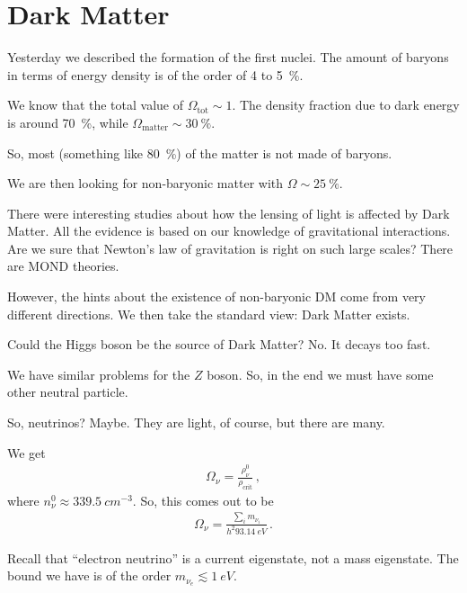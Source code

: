 \documentclass[main.tex]{subfiles}
\begin{document}
\section{Dark Matter}


Yesterday we described the formation of the first nuclei. 
The amount of baryons in terms of energy density is of the order of 4 to \SI{5}{\percent}. 

We know that the total value of \(\Omega _{\text{tot}}  \sim 1\). 
The density fraction due to dark energy is around \SI{70}{\percent}, while \(\Omega _{\text{matter}} \sim \SI{30}{\percent}\).

So, most (something like \SI{80}{\percent}) of the matter is not made of baryons. 

We are then looking for non-baryonic matter with \(\Omega \sim \SI{25}{\percent}\).

There were interesting studies about how the lensing of light is affected by Dark Matter. 
All the evidence is based on our knowledge of gravitational interactions. 
Are we sure that Newton's law of gravitation is right on such large scales? There are MOND theories.

However, the hints about the existence of non-baryonic DM come from very different directions. 
We then take the standard view: Dark Matter exists. 

Could the Higgs boson be the source of Dark Matter? No. 
It decays too fast.

We have similar problems for the \(Z\) boson. So, in the end we must have some other neutral particle.

So, neutrinos? Maybe. They are light, of course, but there are many. 

We get 
%
\begin{align}
\Omega_{\nu } = \frac{\rho^{0}_{\nu }}{\rho _{\text{crit}}} 
\,,
\end{align}
%
where \(n^{0}_{\nu } \approx \SI{339.5}{cm^{-3}}\). So, this comes out to be 
%
\begin{align}
\Omega_{\nu } = \frac{ \sum _{i} m_{\nu_{i}}}{h^2 \SI{93.14}{eV}}
\,.
\end{align}

Recall that ``electron neutrino'' is a current eigenstate, not a mass eigenstate. 
The bound we have is of the order \(m_{\nu_{e}} \lesssim \SI{1}{eV}\).
\end{document}
